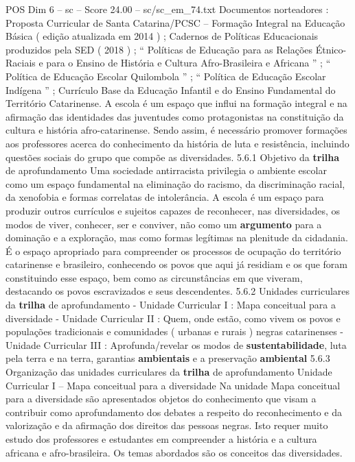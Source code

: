\begin{textsample}{POS Dim 6 – sc – Score 24.00 – sc/sc\_em\_74.txt}
Documentos norteadores : Proposta Curricular de Santa Catarina/PCSC – Formação Integral na Educação Básica ( edição atualizada em 2014 ) ; Cadernos de Políticas Educacionais produzidos pela SED ( 2018 ) ; “ Políticas de Educação para as Relações Étnico-Raciais e para o Ensino de História e Cultura Afro-Brasileira e Africana ” ; “ Política de Educação Escolar Quilombola ” ; “ Política de Educação Escolar Indígena ” ; Currículo Base da Educação Infantil e do Ensino Fundamental do Território Catarinense.
A escola é um espaço que influi na formação integral e na afirmação das identidades das juventudes como protagonistas na constituição da cultura e história afro-catarinense.
Sendo assim, é necessário promover formações aos professores acerca do conhecimento da história de luta e resistência, incluindo questões sociais do grupo que compõe as diversidades. 5.6.1 Objetivo da \textbf{trilha} de aprofundamento Uma sociedade antirracista privilegia o ambiente escolar como um espaço fundamental na eliminação do racismo, da discriminação racial, da xenofobia e formas correlatas de intolerância.
A escola é um espaço para produzir outros currículos e sujeitos capazes de reconhecer, nas diversidades, os modos de viver, conhecer, ser e conviver, não como um \textbf{argumento} para a dominação e a exploração, mas como formas legítimas na plenitude da cidadania.
É o espaço apropriado para compreender os processos de ocupação do território catarinense e brasileiro, conhecendo os povos que aqui já residiam e os que foram constituindo esse espaço, bem como as circunstâncias em que viveram, destacando os povos escravizados e seus descendentes. 5.6.2 Unidades curriculares da \textbf{trilha} de aprofundamento - Unidade Curricular I : Mapa conceitual para a diversidade - Unidade Curricular II : Quem, onde estão, como vivem os povos e populações tradicionais e comunidades ( urbanas e rurais ) negras catarinenses - Unidade Curricular III : Aprofunda/revelar os modos de \textbf{sustentabilidade}, luta pela terra e na terra, garantias \textbf{ambientais} e a preservação \textbf{ambiental} 5.6.3 Organização das unidades curriculares da \textbf{trilha} de aprofundamento Unidade Curricular I – Mapa conceitual para a diversidade Na unidade Mapa conceitual para a diversidade são apresentados objetos do conhecimento que visam a contribuir como aprofundamento dos debates a respeito do reconhecimento e da valorização e da afirmação dos direitos das pessoas negras.
Isto requer muito estudo dos professores e estudantes em compreender a história e a cultura africana e afro-brasileira.
Os temas abordados são os conceitos das diversidades.

\end{textsample}
